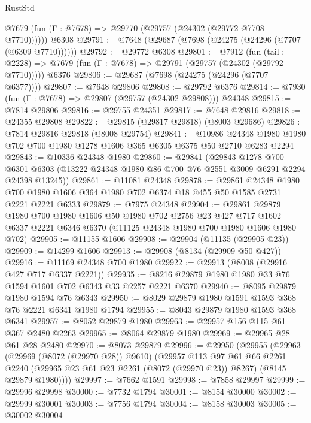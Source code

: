 \begin{lexlean}{RustStd}
\begin{coremodule}
{\begin{coremodule}
{{{{{{{{{{{{{{{{{{{{{{{{{{{{{{{{{{{{{{{{{{{{{{{{{{{{{      @7679 (fun (Γ : @7678) => @29770 (@29757 (@24302 (@29772 @7708 @7710))))))
    @6308
@29791 := @7648 (@29687 (@7698 (@24275 (@24296 (@7707 (@6309 @7710))))))
@29792 := @29772 @6308
@29801 := @7912
    (fun (tail : @2228) => @7679 (fun (Γ : @7678) => @29791 (@29757 (@24302 (@29792 @7710)))))
    @6376
@29806 := @29687 (@7698 (@24275 (@24296 (@7707 @6377))))
@29807 := @7648 @29806
@29808 := @29792 @6376
@29814 := @7930 (fun (Γ : @7678) => @29807 (@29757 (@24302 @29808))) @24348
@29815 := @7814 @29806
@29816 := @29755 @24351
@29817 := @7648 @29816
@29818 := @24355 @29808
@29822 := @29815 (@29817 @29818) (@8003 @29686)
@29826 := @7814 @29816 @29818 (@8008 @29754)
@29841 := @10986
    @24348
    @1980
    @1980
    @702
    @700
    @1980
    @1278
    @1606
    @365
    @6305
    @6375
    @50
    @2710
    @6283
    @2294
@29843 := @10336 @24348 @1980
@29860 := @29841
    (@29843
      @1278
      @700
      @6301
      @6303
      (@13222 @24348 @1980 @86 @700 @76 @2551 @3009 @6291 @2294 @24398 @13245))
@29861 := @11081 @24348
@29878 := @29861
    @24348
    @1980
    @700
    @1980
    @1606
    @364
    @1980
    @702
    @6374
    @18
    @455
    @50
    @1585
    @2731
    @2221
    @2221
    @6333
@29879 := @7975 @24348
@29904 := @29861
    @29879
    @1980
    @700
    @1980
    @1606
    @50
    @1980
    @702
    @2756
    @23
    @427
    @717
    @1602
    @6337
    @2221
    @6346
    @6370
    (@11125 @24348 @1980 @700 @1980 @1606 @1980 @702)
@29905 := @11155 @1606
@29908 := @29904 (@11135 (@29905 @23))
@29909 := @14299 @1606
@29913 := @29908 (@8134 (@29909 @50 @427))
@29916 := @11169 @24348 @700 @1980
@29922 := @29913 (@8008 (@29916 @427 @717 @6337 @2221))
@29935 := @8216 @29879 @1980 @1980 @33 @76 @1594 @1601 @702 @6343 @33 @2257 @2221 @6370
@29940 := @8095 @29879 @1980 @1594 @76 @6343
@29950 := @8029 @29879 @1980 @1591 @1593 @368 @76 @2221 @6341 @1980 @1794
@29955 := @8043 @29879 @1980 @1593 @368 @6341
@29957 := @8052 @29879 @1980
@29963 := @29957 @156 @115 @61 @367 @2480 @2263
@29965 := @8064 @29879 @1980
@29969 := @29965 @28 @61 @28 @2480
@29970 := @8073 @29879
@29996 := @29950
    (@29955
      (@29963
        (@29969 (@8072 (@29970 @28)) @9610)
        (@29957
          @113
          @97
          @61
          @66
          @2261
          @2240
          (@29965 @23 @61 @23 @2261 (@8072 (@29970 @23)) @8267)
          (@8145 @29879 @1980))))
@29997 := @7662 @1591
@29998 := @7858 @29997
@29999 := @29996 @29998
@30000 := @7732 @1794
@30001 := @8154 @30000
@30002 := @29999 @30001
@30003 := @7756 @1794
@30004 := @8158 @30003
@30005 := @30002 @30004
}}}}}}}}}}}}}}}}}}}}}}}}}}}}}}}}}}}}}}}}}}}}}}}}}}}}}
\end{coremodule}}
\end{coremodule}
\end{lexlean}
